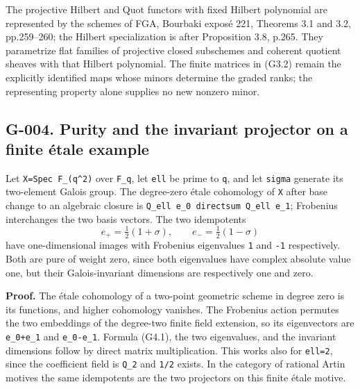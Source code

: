 \documentclass[
  10pt,
]{article}
\begin{document}
The projective Hilbert and Quot functors with fixed Hilbert polynomial
are represented by the schemes of FGA, Bourbaki exposé 221, Theorems 3.1
and 3.2, pp.259--260; the Hilbert specialization is after Proposition
3.8, p.265. They parametrize flat families of projective closed
subschemes and coherent quotient sheaves with that Hilbert polynomial.
The finite matrices in (G3.2) remain the explicitly identified maps
whose minors determine the graded ranks; the representing property alone
supplies no new nonzero minor.

\subsection{G-004. Purity and the invariant projector on a finite étale
example}\label{g-004.-purity-and-the-invariant-projector-on-a-finite-uxe9tale-example}

Let
\texttt{\small X=\allowbreak{}Spec F\_\allowbreak{}(\allowbreak{}q\textasciicircum{}2)\allowbreak{}}
over \texttt{\small F\_\allowbreak{}q}, let \texttt{\small ell} be prime
to \texttt{\small q}, and let \texttt{\small sigma} generate its
two-element Galois group. The degree-zero étale cohomology of
\texttt{\small X} after base change to an algebraic closure is
\texttt{\small Q\_\allowbreak{}ell e\_\allowbreak{}0 directsum Q\_\allowbreak{}ell e\_\allowbreak{}1};
Frobenius interchanges the two basis vectors. The two idempotents \[
e_+=\tfrac12(1+\sigma),\qquad e_-=\tfrac12(1-\sigma)
\tag{G4.1}
\] have one-dimensional images with Frobenius eigenvalues
\texttt{\small 1} and \texttt{\small -\allowbreak{}1} respectively. Both
are pure of weight zero, since both eigenvalues have complex absolute
value one, but their Galois-invariant dimensions are respectively one
and zero.

\textbf{Proof.} The étale cohomology of a two-point geometric scheme in
degree zero is its functions, and higher cohomology vanishes. The
Frobenius action permutes the two embeddings of the degree-two finite
field extension, so its eigenvectors are
\texttt{\small e\_\allowbreak{}0+\allowbreak{}e\_\allowbreak{}1} and
\texttt{\small e\_\allowbreak{}0-\allowbreak{}e\_\allowbreak{}1}.
Formula (G4.1), the two eigenvalues, and the invariant dimensions follow
by direct matrix multiplication. This works also for
\texttt{\small ell=\allowbreak{}2}, since the coefficient field is
\texttt{\small Q\_\allowbreak{}2} and \texttt{\small 1/\allowbreak{}2}
exists. In the category of rational Artin motives the same idempotents
are the two projectors on this finite étale motive.
\end{document}
